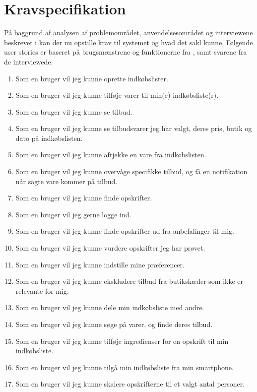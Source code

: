 \section{Kravspecifikation}

På baggrund af analysen af problemområdet, anvendelsesområdet og interviewene beskrevet i   kan der nu opstille krav til systemet og hvad det sakl kunne.
Følgende user stories er baseret på brugsmønstrene og funktionerne fra , samt svarene fra de interviewede.

\begin{enumerate}
	\item Som en bruger vil jeg kunne oprette indkøbslister.
	\item Som en bruger vil jeg kunne tilføje varer til min(e) indkøbsliste(r).
	\item Som en bruger vil jeg kunne se tilbud.
	\item Som en bruger vil jeg kunne se tilbudsvarer jeg har valgt, deres pris, butik og dato på indkøbslisten.
	\item Som en bruger vil jeg kunne aftjekke en vare fra indkøbslisten.
	\item Som en bruger vil jeg kunne overvåge specifikke tilbud, og få en notifikation når sagte vare kommer på tilbud.
	\item Som en bruger vil jeg kunne finde opskrifter.
	\item Som en bruger vil jeg gerne logge ind.
	\item Som en bruger vil jeg kunne finde opskrifter ud fra anbefalinger til mig.
	\item Som en bruger vil jeg kunne vurdere opskrifter jeg har prøvet.
	\item Som en bruger vil jeg kunne indstille mine præferencer.
	\item Som en bruger vil jeg kunne ekskludere tilbud fra butikskæder som ikke er relevante for mig.
	\item Som en bruger vil jeg kunne dele min indkøbsliste med andre.
	\item Som en bruger vil jeg kunne søge på varer, og finde deres tilbud.
	\item Som en bruger vil jeg kunne tilføje ingredienser for en opskrift til min indkøbsliste.
	\item Som en bruger vil jeg kunne tilgå min indkøbsliste fra min smartphone.
	\item Som en bruger vil jeg kunne skalere opskrifterne til et valgt antal personer.
\end{enumerate}

